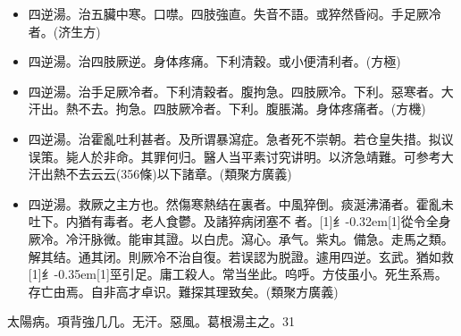 \documentclass[11pt,oneside,b5paper]{ctexbook}
\begin{document}
\begin{flushleft}
\begin{itemize}
\item 四逆湯。治五臟中寒。口噤。四肢強直。失音不語。或猝然昏闷。手足厥冷者。(济生方)
\item 四逆湯。治四肢厥逆。身体疼痛。下利清穀。或小便清利者。(方極)
\item 四逆湯。治手足厥冷者。下利清穀者。腹拘急。四肢厥冷。下利。惡寒者。大汗出。熱不去。拘急。四肢厥冷者。下利。腹脹滿。身体疼痛者。(方機)
\item 四逆湯。治霍亂吐利甚者。及所谓暴瀉症。急者死不崇朝。若仓皇失措。拟议误策。毙人於非命。其罪何归。醫人当平素讨究讲明。以济急靖難。可参考大汗出熱不去云云(356條)以下諸章。(類聚方廣義)
\item 四逆湯。救厥之主方也。然傷寒熱结在裏者。中風猝倒。痰涎沸涌者。霍亂未吐下。内猶有毒者。老人食鬱。及諸猝病闭塞不{𫔭}者。{\hbox{\scalebox{0.6}[1]{纟}\kern-0.32em\scalebox{0.7}[1]{從}}}令全身厥冷。冷汗脉微。能审其證。以白虎。瀉心。承气。紫丸。備急。走馬之類。解其结。通其闭。則厥冷不治自復。若误認为脱證。遽用四逆。玄武。猶如救{\hbox{\scalebox{0.68}[1]{纟}\kern-0.35em\scalebox{0.64}[1]{巠}}}引足。庸工殺人。常当坐此。呜呼。方伎虽小。死生系焉。存亡由焉。自非高才卓识。難探其理致矣。(類聚方廣義)
\end{itemize}

太陽病。項背強几几。无汗。惡風。葛根湯主之。31


\end{flushleft}
\end{document}
